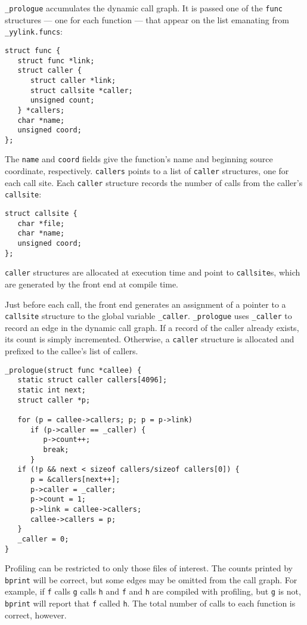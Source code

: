 \verb|_prologue| accumulates the dynamic call graph.
It is passed one of the \verb|func| structures --- one for each function --- that appear 
on the list emanating from \verb|_yylink.funcs|:
\begin{verbatim}
struct func {
   struct func *link;
   struct caller {
      struct caller *link;
      struct callsite *caller;
      unsigned count;
   } *callers;
   char *name;
   unsigned coord;
};
\end{verbatim}
The \verb|name| and \verb|coord| fields give the function's name and beginning source
coordinate, respectively.
\verb|callers| points to a list of \verb|caller| structures, one for each
call site. Each \verb|caller| structure records the number of calls
from the caller's \verb|callsite|:
\begin{verbatim}
struct callsite {
   char *file;
   char *name;
   unsigned coord;
};
\end{verbatim}
\verb|caller| structures are allocated at execution time
and point to \verb|callsite|s, which are generated by the front end
at compile time. 

Just before each call, the front end generates an assignment
of a pointer to a \verb|callsite| structure to the global variable \verb|_caller|.
\verb|_prologue| uses \verb|_caller| to record an edge in the dynamic call graph.
If a record of the caller already exists, its count is simply incremented.
Otherwise, a \verb|caller| structure is allocated and prefixed to
the callee's list of callers.
\begin{verbatim}
_prologue(struct func *callee) {
   static struct caller callers[4096];
   static int next;
   struct caller *p;

   for (p = callee->callers; p; p = p->link)
      if (p->caller == _caller) {
         p->count++;
         break;
      }
   if (!p && next < sizeof callers/sizeof callers[0]) {
      p = &callers[next++];
      p->caller = _caller;
      p->count = 1;
      p->link = callee->callers;
      callee->callers = p;
   }
   _caller = 0;
}
\end{verbatim}

Profiling can be restricted to only those files of interest.
The counts printed by \verb|bprint| will be correct,
but some edges may be omitted from the call graph.
For example, if \verb|f| calls \verb|g| calls \verb|h|
and \verb|f| and \verb|h| are compiled with profiling, but \verb|g| is not,
\verb|bprint| will report that \verb|f| called \verb|h|.
The total number of calls to each function is correct, however.


